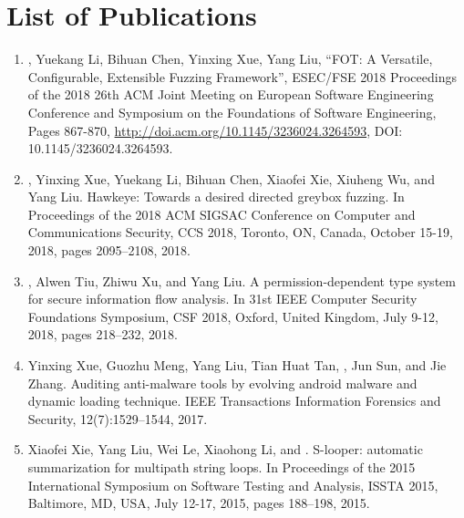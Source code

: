 \chapter{List of Publications} \label{app:paper}

\begin{enumerate}
\item \myname, Yuekang Li, Bihuan Chen, Yinxing Xue, Yang Liu, ``FOT: A Versatile, Configurable, Extensible Fuzzing Framework'', ESEC/FSE 2018 Proceedings of the 2018 26th ACM Joint Meeting on European Software Engineering Conference and Symposium on the Foundations of Software Engineering, Pages 867-870, \url{http://doi.acm.org/10.1145/3236024.3264593}, DOI: 10.1145/3236024.3264593.
\item \myname, Yinxing Xue, Yuekang Li, Bihuan Chen, Xiaofei Xie, Xiuheng Wu, and Yang Liu. Hawkeye: Towards a desired directed greybox fuzzing. In Proceedings of the 2018 ACM SIGSAC Conference on Computer and Communications Security, CCS 2018, Toronto, ON, Canada, October 15-19, 2018, pages 2095–2108, 2018.
\item \myname, Alwen Tiu, Zhiwu Xu, and Yang Liu. A permission-dependent type system for secure information flow analysis. In 31st IEEE Computer Security Foundations Symposium, CSF 2018, Oxford, United Kingdom, July 9-12, 2018, pages 218–232, 2018.
\item Yinxing Xue, Guozhu Meng, Yang Liu, Tian Huat Tan, \myname, Jun Sun, and Jie Zhang. Auditing anti-malware tools by evolving android malware and dynamic loading technique. IEEE Transactions Information Forensics and Security, 12(7):1529–1544, 2017.
\item Xiaofei Xie, Yang Liu, Wei Le, Xiaohong Li, and \myname. S-looper: automatic summarization for multipath string loops. In Proceedings of the 2015 International Symposium on Software Testing and Analysis, ISSTA 2015, Baltimore, MD, USA, July 12-17, 2015, pages 188–198, 2015.
\end{enumerate}
